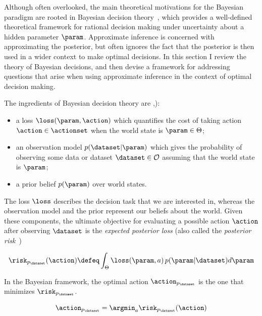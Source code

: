 Although often overlooked, the main theoretical motivations for the Bayesian paradigm are rooted in Bayesian decision theory~\citep{berger85decision}, which provides a well-defined theoretical framework for rational decision making under uncertainty about a hidden parameter $\param$. Approximate inference is concerned with approximating the posterior, but often ignores the fact that the posterior is then used in a wider context to make optimal decisions. In this section I review the theory of Bayesian decisions, and then devise a framework for addressing questions that arise when using approximate inference in the context of optimal decision making.

The ingredients of Bayesian decision theory are \citep[][Chapter 2]{robert01choice},\citep[][Chapter 1]{berger85decision}):
\vspace{-.3cm}
\begin{itemize}
  \item a loss $\loss(\param,\action)$ which quantifies the cost of taking action $\action \in \actionset$ when the world state is $\param \in \Theta$; %
  \item an observation model $p(\dataset|\param)$ which gives the probability of observing some data or dataset $\dataset \in \mathcal{O}$ assuming that the world state is $\param$;
  \item a prior belief $p(\param)$ over world states.
\end{itemize}

The loss $\loss$ describes the decision task that we are interested in, whereas the observation model and the prior represent our beliefs about the world. Given these components, the ultimate objective for evaluating a possible action $\action$ after observing $\dataset$ is the \emph{expected posterior loss} (also called the \emph{posterior risk}~\citep{schervish95theory})

\begin{equation}
	\risk_{p_\dataset}(\action) \defeq \int_\Theta \loss(\param, a) \, p(\param|\dataset) d\param
\end{equation}

In the Bayesian framework, the optimal action $\action_{p_\dataset}$ is the one that minimizes $\risk_{p_\dataset}$.

\begin{equation}
	\action_{p_\dataset} = \argmin_{a} \risk_{p_\dataset}(\action)
\end{equation}

